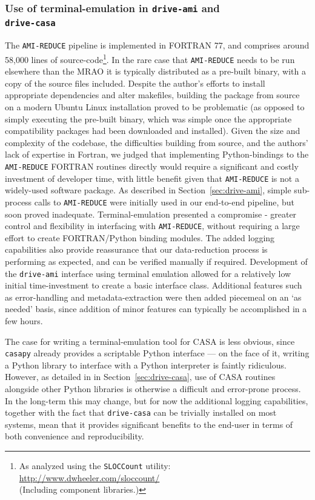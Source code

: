\documentclass[5p,authoryear]{elsarticle}
\begin{document}
\subsubsection{Use of terminal-emulation in \texttt{drive-ami} and \\ \texttt{drive-casa}}
\label{sec:why-emulation}
The \texttt{AMI-REDUCE} pipeline is implemented in \mbox{FORTRAN} 77, and comprises around 58,000 lines of 
source-code\footnote{As analyzed using the \texttt{SLOCCount} utility: \\ \url{http://www.dwheeler.com/sloccount/}\\
(Including component libraries.)}. 
In the rare case that \texttt{AMI-REDUCE} needs to be run elsewhere than the MRAO it is typically distributed as a pre-built binary, with a copy of the source files included. 
Despite the author's efforts to install appropriate dependencies and alter makefiles, building the package from source on a modern Ubuntu Linux installation proved to be problematic (as opposed to simply executing the pre-built binary, which was simple once the appropriate compatibility packages had been downloaded and installed). 
Given the size and complexity of the codebase, the difficulties building from source, and the authors' lack of expertise in Fortran, we judged that implementing Python-bindings to the \texttt{AMI-REDUCE} \mbox{FORTRAN} routines directly would require a significant and costly investment of developer time, with little benefit given that \texttt{AMI-REDUCE} is not a widely-used software package. 
As described in Section~\ref{sec:drive-ami}, simple sub-process calls to \texttt{AMI-REDUCE} were initially used in our end-to-end pipeline, but soon proved inadequate. 
Terminal-emulation presented a compromise - greater control and flexibility in interfacing with \texttt{AMI-REDUCE}, without requiring a large effort to create \mbox{FORTRAN}/Python binding modules. 
The added logging capabilities also provide reassurance that our data-reduction process is performing as expected, and can be verified manually if required.
Development of the \texttt{drive-ami} interface using terminal emulation allowed for a relatively low initial time-investment to create a basic interface class. 
Additional features such as error-handling and metadata-extraction were then added piecemeal on an `as needed' basis, since addition of minor features can typically be accomplished in a few hours.

The case for writing a terminal-emulation tool for CASA is less obvious, since \texttt{casapy} already provides a scriptable Python interface --- on the face of it, writing a Python library to interface with a Python interpreter is faintly ridiculous.
However, as detailed in in Section~\ref{sec:drive-casa}, use of CASA routines alongside other Python libraries is otherwise a difficult and error-prone process. 
In the long-term this may change, but for now the additional logging capabilities, together with the fact that \texttt{drive-casa} can be trivially installed on most systems, mean that it provides significant benefits to the end-user in terms of both convenience and reproducibility.
\end{document}
